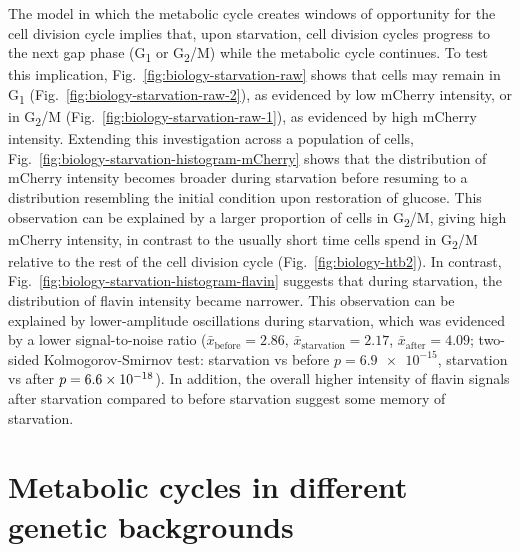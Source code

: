 The model in which the metabolic cycle creates windows of opportunity for the cell division cycle implies that, upon starvation, cell division cycles progress to the next gap phase (G\textsubscript{1} or G\textsubscript{2}/M) while the metabolic cycle continues.
To test this implication, Fig.\ \ref{fig:biology-starvation-raw} shows that cells may remain in G\textsubscript{1} (Fig.\ \ref{fig:biology-starvation-raw-2}), as evidenced by low mCherry intensity, or in G\textsubscript{2}/M (Fig.\ \ref{fig:biology-starvation-raw-1}), as evidenced by high mCherry intensity.
Extending this investigation across a population of cells, Fig.\ \ref{fig:biology-starvation-histogram-mCherry} shows that the distribution of mCherry intensity becomes broader during starvation before resuming to a distribution resembling the initial condition upon restoration of glucose.
This observation can be explained by a larger proportion of cells in G\textsubscript{2}/M, giving high mCherry intensity, in contrast to the usually short time cells spend in G\textsubscript{2}/M relative to the rest of the cell division cycle (Fig.\ \ref{fig:biology-htb2}).
In contrast, Fig.\ \ref{fig:biology-starvation-histogram-flavin} suggests that during starvation, the distribution of flavin intensity became narrower.
This observation can be explained by lower-amplitude oscillations during starvation, which was evidenced by a lower signal-to-noise ratio ($\bar{x}_{\mathrm{before}} = 2.86$, $\bar{x}_{\mathrm{starvation}} = 2.17$, $\bar{x}_{\mathrm{after}} = 4.09$; two-sided Kolmogorov-Smirnov test: starvation vs before $p = \num{6.9e-15}$, starvation vs after $p = \num{6.6d-18}$).
In addition, the overall higher intensity of flavin signals after starvation compared to before starvation suggest some memory of starvation.


\section{Metabolic cycles in different genetic backgrounds}
\label{sec:biology-backgrounds}

